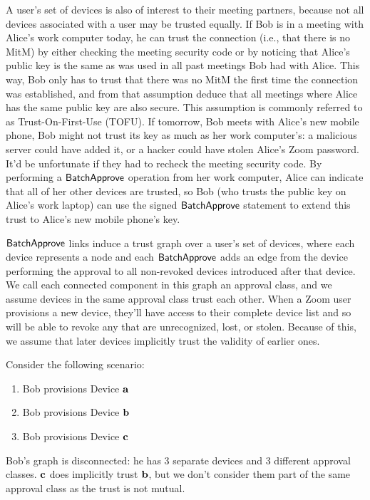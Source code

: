 A user’s set of devices is also of interest to their meeting partners, because not all devices
associated with a user may be trusted equally. If Bob is in a meeting with Alice's work computer
today, he can trust the connection (i.e., that there is no MitM) by either checking the meeting
security code or by noticing that Alice’s public key is the same as was used in all past meetings
Bob had with Alice. This way, Bob only has to trust that there was no MitM the first time the
connection was established, and from that assumption deduce that all meetings where Alice has the
same public key are also secure. This assumption is commonly referred to as Trust-On-First-Use
(TOFU). If tomorrow, Bob meets with Alice's new mobile phone, Bob might not trust its key as much as
her work computer’s: a malicious server could have added it, or a hacker could have stolen Alice's
Zoom password. It'd be unfortunate if they had to recheck the meeting security code. By performing
a $\mathsf{BatchApprove}{}$ operation from her work computer, Alice can indicate that all of her other
devices are trusted, so Bob (who trusts the public key on Alice’s work laptop) can use the signed
$\mathsf{BatchApprove}{}$ statement to extend this trust to Alice's new mobile phone’s key.

$\mathsf{BatchApprove}{}$ links induce a trust graph over a user's set of devices, where each device
represents a node and each $\mathsf{BatchApprove}{}$ adds an edge from the device performing the approval to
all non-revoked devices introduced after that device. We call each connected component in this graph
an approval class, and we assume devices in the same approval class trust each other. When a Zoom user
provisions a new device, they'll have access to their complete device list and so will be able to
revoke any that are unrecognized, lost, or stolen. Because of this, we assume that later devices
implicitly trust the validity of earlier ones.

Consider the following scenario:
\begin{enumerate}
\item Bob provisions Device $\mathbf{a}$
\item Bob provisions Device $\mathbf{b}$
\item Bob provisions Device $\mathbf{c}$
\end{enumerate}

Bob's graph is disconnected: he has 3 separate devices and 3 different approval classes. $\mathbf{c}$
does implicitly trust $\mathbf{b}$, but we don't consider them part of the same approval class as the
trust is not mutual.

